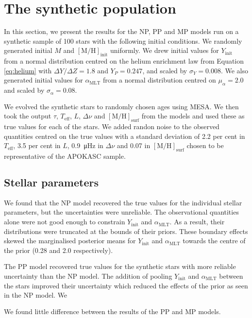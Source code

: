 \documentclass[a4paper,fleqn,usenatbib]{mnras}
\newcommand{\dnu}{\ensuremath{\Delta\nu}}
\newcommand{\metallicity}{\ensuremath{[\mathrm{M}/\mathrm{H}]}}
\newcommand{\teff}{\ensuremath{T_\mathrm{eff}}}
\newcommand{\mlt}{\ensuremath{{\alpha_\mathrm{MLT}}}}
\begin{document}
\section{The synthetic population}\label{sec:test-stars}

In this section, we present the results for the NP, PP and MP models run on a synthetic sample of 100 stars with the following initial conditions. We randomly generated initial $M$ and $\metallicity_\mathrm{init}$ uniformly. We drew initial values for $Y_\mathrm{init}$ from a normal distribution centred on the helium enrichment law from Equation \ref{eq:helium} with $\Delta Y / \Delta Z = 1.8$ and $Y_P = 0.247$, and scaled by $\sigma_Y = 0.008$. We also generated initial values for $\mlt$ from a normal distribution centred on $\mu_\alpha = 2.0$ and scaled by $\sigma_\alpha = 0.08$.

We evolved the synthetic stars to randomly chosen ages using MESA. We then took the output $\tau$, $\teff$, $L$, $\dnu$ and $\metallicity_\mathrm{surf}$ from the models and used these as true values for each of the stars. We added randon noise to the observed quantities centred on the true values with a standard deviation of 2.2 per cent in $\teff$, 3.5 per cent in $L$, \SI{0.9}{\micro\hertz} in $\dnu$ and \SI{0.07}{\dex} in $\metallicity_\mathrm{surf}$ chosen to be representative of the APOKASC sample.

\subsection{Stellar parameters}

We found that the NP model recovered the true values for the individual stellar parameters, but the uncertainties were unreliable. The observational quantities alone were not good enough to constrain $Y_\mathrm{init}$ and $\mlt$. As a result, their distributions were truncated at the bounds of their priors. These boundary effects skewed the marginalised posterior means for $Y_\mathrm{init}$ and $\mlt$ towards the centre of the prior (0.28 and 2.0 respectively).

The PP model recovered true values for the synthetic stars with more reliable uncertainty than the NP model. The addition of pooling $Y_\mathrm{init}$ and $\mlt$ between the stars improved their uncertainty which reduced the effects of the prior as seen in the NP model. We

We found little difference between the results of the PP and MP models.
\end{document}
